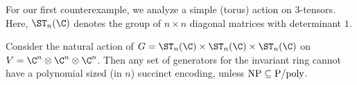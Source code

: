 \setcounter{theorem}{7}
For our first counterexample, we analyze a simple (torus) action on $3$-tensors.
Here, $\ST_n(\C)$ denotes the group of $n\times n$ diagonal matrices with determinant $1$.

\begin{theorem}\label{thm:torus-action}
Consider the natural action of $G = \ST_n(\C) \times \ST_n(\C) \times \ST_n(\C)$ on $V = \C^n \otimes \C^n \otimes \C^n$. Then any set of generators for the invariant ring cannot have a polynomial sized (in $n$) succinct encoding, unless ${\rm NP \subseteq P/poly}$.
\end{theorem}
